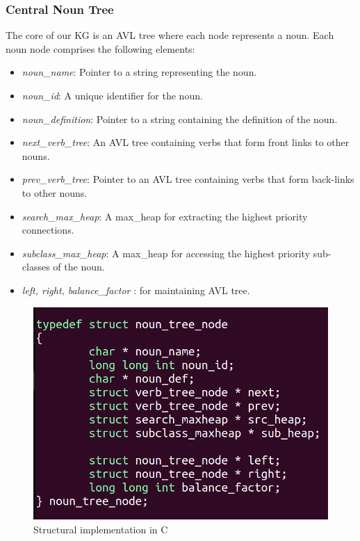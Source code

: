 \documentclass[conference]{IEEEtran}
\begin{document}
\subsubsection{\textbf{Central Noun Tree}}
The core of our KG is an AVL tree where each node represents a noun. Each noun node comprises the following elements:
\begin{itemize}

    \item \textit{noun\_name}: Pointer to a string representing the noun.
    \item \textit{noun\_id}: A unique identifier for the noun.
    \item \textit{noun\_definition}: Pointer to a string containing the definition of the noun.
    \item \textit{next\_verb\_tree}: An AVL tree containing verbs that form front links to other nouns.
    \item \textit{prev\_verb\_tree}: Pointer to an AVL tree containing verbs that form back-links to other nouns.
    \item \textit{search\_max\_heap}: A max\_heap for extracting the highest priority connections.
    \item \textit{subclass\_max\_heap}: A max\_heap for accessing the highest priority sub-classes of the noun.
    \item \textit{left, right, balance\_factor} : for maintaining AVL tree. 
    
\end{itemize}

\begin{figure}[htbp]
\centering
\includegraphics[width=0.8\linewidth]{c1.png} %
\caption{Structural implementation in C}
\label{fig}
\end{figure}
\end{document}

